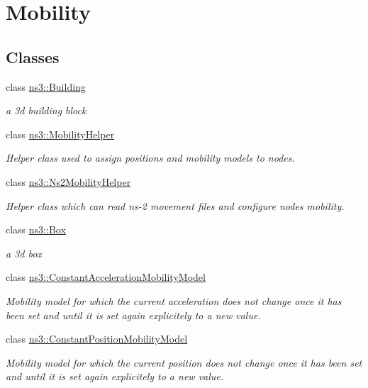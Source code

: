 \hypertarget{group__mobility}{}\section{Mobility}
\label{group__mobility}
\subsection*{Classes}
\begin{DoxyCompactItemize}
\item 
class \hyperlink{classns3_1_1Building}{ns3\+::\+Building}
\begin{DoxyCompactList}\small\item\em a 3d building block \end{DoxyCompactList}\item 
class \hyperlink{classns3_1_1MobilityHelper}{ns3\+::\+Mobility\+Helper}
\begin{DoxyCompactList}\small\item\em Helper class used to assign positions and mobility models to nodes. \end{DoxyCompactList}\item 
class \hyperlink{classns3_1_1Ns2MobilityHelper}{ns3\+::\+Ns2\+Mobility\+Helper}
\begin{DoxyCompactList}\small\item\em Helper class which can read ns-\/2 movement files and configure nodes mobility. \end{DoxyCompactList}\item 
class \hyperlink{classns3_1_1Box}{ns3\+::\+Box}
\begin{DoxyCompactList}\small\item\em a 3d box \end{DoxyCompactList}\item 
class \hyperlink{classns3_1_1ConstantAccelerationMobilityModel}{ns3\+::\+Constant\+Acceleration\+Mobility\+Model}
\begin{DoxyCompactList}\small\item\em Mobility model for which the current acceleration does not change once it has been set and until it is set again explicitely to a new value. \end{DoxyCompactList}\item 
class \hyperlink{classns3_1_1ConstantPositionMobilityModel}{ns3\+::\+Constant\+Position\+Mobility\+Model}
\begin{DoxyCompactList}\small\item\em Mobility model for which the current position does not change once it has been set and until it is set again explicitely to a new value. \end{DoxyCompactList}\item 

\end{DoxyCompactItemize}
